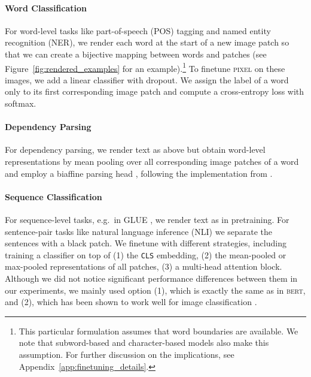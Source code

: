 \documentclass{article}
\newcommand{\model}{\textsc{pixel}\xspace}
\begin{document}
\vspace{-2mm}
\paragraph{Word Classification} For word-level tasks like part-of-speech (POS) tagging and named entity recognition (NER), we render each word at the start of a new image patch so that we can create a bijective mapping between words and patches (see Figure~\ref{fig:rendered_examples} for an example).\footnote{This particular formulation assumes that word boundaries are available. We note that subword-based and character-based models also make this assumption. For further discussion on the implications, see Appendix~\ref{app:finetuning_details}.} To finetune \model on these images, we add a linear classifier with dropout. We assign the label of a word only to its first corresponding image patch and compute a cross-entropy loss with softmax.

\vspace{-2mm}
\paragraph{Dependency Parsing} For dependency parsing, we render text as above but obtain word-level representations by mean pooling over all corresponding image patches of a word and employ a biaffine parsing head \citep{DBLP:conf/iclr/DozatM17}, following the implementation from \cite{glavas-vulic-2021-supervised}.

\vspace{-2mm}
\paragraph{Sequence Classification} For sequence-level tasks, e.g.\ in GLUE \citep{wang-etal-2018-glue}, we render text as in pretraining. For sentence-pair tasks like natural language inference (NLI) we separate the sentences with a black patch. We finetune with different strategies, including training a classifier on top of
(1) the {\footnotesize\texttt{CLS}} embedding, (2) the mean-pooled or max-pooled representations of all patches, (3) a multi-head attention block. Although we did not notice significant performance differences between them in our experiments, we mainly used option (1), which is exactly the same as in \textsc{bert}, and (2), which has been shown to work well for image classification \citep{https://doi.org/10.48550/arxiv.2205.14540}.

\vspace{-2mm}
\end{document}
